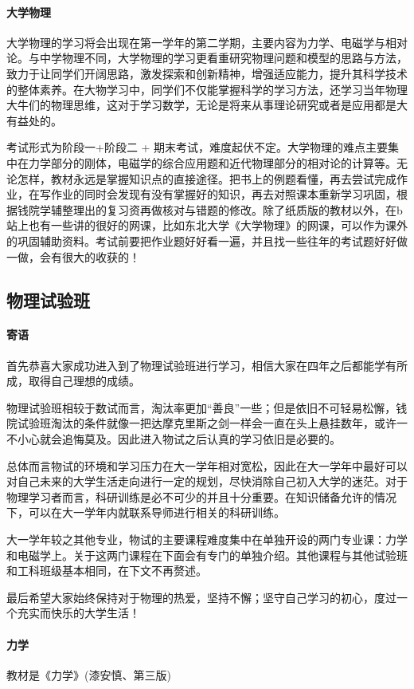 \documentclass[
decoration,  %
]{qyxf-book}
\begin{document}
\paragraph{大学物理}
大学物理的学习将会出现在第一学年的第二学期，主要内容为力学、电磁学与相对论。与中学物理不同，大学物理的学习更看重研究物理问题和模型的思路与方法，致力于让同学们开阔思路，激发探索和创新精神，增强适应能力，提升其科学技术的整体素养。在大物学习中，同学们不仅能掌握科学的学习方法，还学习当年物理大牛们的物理思维，这对于学习数学，无论是将来从事理论研究或者是应用都是大有益处的。

考试形式为阶段一+阶段二 + 期末考试，难度起伏不定。大学物理的难点主要集中在力学部分的刚体，电磁学的综合应用题和近代物理部分的相对论的计算等。无论怎样，教材永远是掌握知识点的直接途径。把书上的例题看懂，再去尝试完成作业，在写作业的同时会发现有没有掌握好的知识，再去对照课本重新学习巩固，根据钱院学辅整理出的复习资再做核对与错题的修改。除了纸质版的教材以外，在b站上也有一些讲的很好的网课，比如东北大学《大学物理》的网课，可以作为课外的巩固辅助资料。考试前要把作业题好好看一遍，并且找一些往年的考试题好好做一做，会有很大的收获的！


\subsection{物理试验班}
\paragraph{寄语}\par
首先恭喜大家成功进入到了物理试验班进行学习，相信大家在四年之后都能学有所成，取得自己理想的成绩。

物理试验班相较于数试而言，淘汰率更加“善良”一些；但是依旧不可轻易松懈，钱院试验班淘汰的条件就像一把达摩克里斯之剑一样会一直在头上悬挂数年，或许一不小心就会追悔莫及。因此进入物试之后认真的学习依旧是必要的。

总体而言物试的环境和学习压力在大一学年相对宽松，因此在大一学年中最好可以对自己未来的大学生活走向进行一定的规划，尽快消除自己初入大学的迷茫。对于物理学习者而言，科研训练是必不可少的并且十分重要。在知识储备允许的情况下，可以在大一学年内就联系导师进行相关的科研训练。

大一学年较之其他专业，物试的主要课程难度集中在单独开设的两门专业课：力学和电磁学上。关于这两门课程在下面会有专门的单独介绍。其他课程与其他试验班和工科班级基本相同，在下文不再赘述。

最后希望大家始终保持对于物理的热爱，坚持不懈；坚守自己学习的初心，度过一个充实而快乐的大学生活！
\paragraph{力学}
教材是《力学》(漆安慎、第三版)
\end{document}
